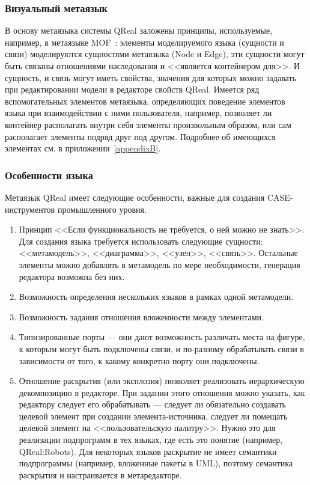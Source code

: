 \subsubsection{Визуальный метаязык}
В основу метаязыка системы QReal заложены принципы, используемые, например, в метаязыке MOF~\cite{mof}: 
элементы моделируемого языка (сущности и связи) моделируются сущностями метаязыка 
(Node и Edge), эти сущности могут быть связаны отношениями наследования и <<является контейнером для>>. 
И сущность, и связь могут иметь свойства, значения для которых можно задавать при 
редактировании модели в редакторе свойств QReal. Имеется ряд вспомогательных элементов 
метаязыка, определяющих поведение элементов языка при взаимодействии с ними пользователя, 
например, позволяет ли контейнер располагать внутри себя элементы произвольным образом, 
или сам располагает элементы подряд друг под другом. Подробнее об имеющихся элементах 
см. в приложении~\ref{appendixB}.

\subsubsection{Особенности языка}
Метаязык QReal имеет следующие особенности, важные для создания CASE-инструментов 
промышленного уровня.

\begin{enumerate}
	\item Принцип <<Если функциональность не требуется, о ней можно не знать>>. Для создания
		языка требуется использовать следующие сущности: <<метамодель>>, <<диаграмма>>,
		<<узел>>, <<связь>>. Остальные элементы можно добавлять в метамодель по мере необходимости,
		генерация редактора возможна без них.
	\item Возможность определения нескольких языков в рамках одной метамодели. 
	\item Возможность задания отношения вложенности между элементами.
	\item Типизированные порты --- они дают возможность различать места на фигуре, к которым 
		могут быть подключены связи, и по-разному обрабатывать связи в зависимости от 
		того, к какому конкретно порту они подключены.
	\item Отношение раскрытия (или эксплозия) позволяет реализовать иерархическую декомпозицию
		в редакторе. При задании этого отношения можно указать, как редактору следует его 
		обрабатывать --- следует ли обязательно создавать целевой элемент при создании 
		элемента-источника, следует ли помещать целевой элемент на <<пользовательскую палитру>>.
		Нужно это для реализации подпрограмм в тех языках, где есть это понятие (например, QReal:Robots).
		Для некоторых языков раскрытие не имеет семантики подпрограммы (например, вложенные пакеты
		в UML), поэтому семантика раскрытия и настраивается в метаредакторе.
\end{enumerate}

